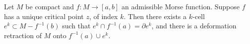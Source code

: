 Let $M$ be compact and $f: M \to [a,b]$ an admissible Morse function. Suppose $f$ has a unique critical point $z$, of index $k$. Then there exists a $k$-cell $e^k \subset M - f^{-1}(b)$ such that $e^k \cap f^{-1}(a) = \partial e^k$, and there is a deformation retraction of $M$ onto $f^{-1}(a) \cup e^k$.
